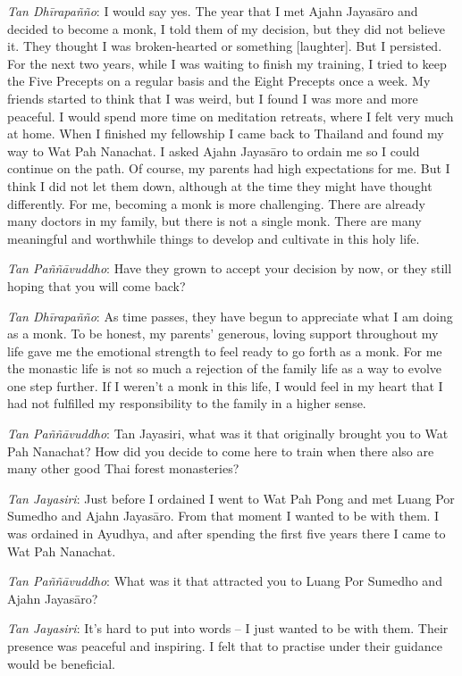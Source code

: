 \emph{Tan Dhīrapañño}: I would say yes. The year that I met Ajahn
Jayasāro and decided to become a monk, I told them of my decision, but
they did not believe it. They thought I was broken-hearted or something
[laughter]. But I persisted. For the next two years, while I was
waiting to finish my training, I tried to keep the Five Precepts on a
regular basis and the Eight Precepts once a week. My friends started to
think that I was weird, but I found I was more and more peaceful. I
would spend more time on meditation retreats, where I felt very much at
home. When I finished my fellowship I came back to Thailand and found my
way to Wat Pah Nanachat. I asked Ajahn Jayasāro to ordain me so I could
continue on the path. Of course, my parents had high expectations for
me. But I think I did not let them down, although at the time they might
have thought differently. For me, becoming a monk is more challenging. 
There are already many doctors in my family, but there is not a single
monk. There are many meaningful and worthwhile things to develop and
cultivate in this holy life. 

\emph{Tan Paññāvuddho}: Have they grown to accept your decision by now, 
or they still hoping that you will come back? 

\emph{Tan Dhīrapañño}: As time passes, they have begun to appreciate
what I am doing as a monk. To be honest, my parents' generous, loving
support throughout my life gave me the emotional strength to feel ready
to go forth as a monk. For me the monastic life is not so much a
rejection of the family life as a way to evolve one step further. If I
weren't a monk in this life, I would feel in my heart that I had not
fulfilled my responsibility to the family in a higher sense. 

\emph{Tan Paññāvuddho}: Tan Jayasiri, what was it that originally
brought you to Wat Pah Nanachat? How did you decide to come here to
train when there also are many other good Thai forest monasteries? 

\emph{Tan Jayasiri}: Just before I ordained I went to Wat Pah Pong and
met Luang Por Sumedho and Ajahn Jayasāro. From that moment I wanted to
be with them. I was ordained in Ayudhya, and after spending the first
five years there I came to Wat Pah Nanachat. 

\emph{Tan Paññāvuddho}: What was it that attracted you to Luang Por
Sumedho and Ajahn Jayasāro? 

\emph{Tan Jayasiri}: It's hard to put into words -- I just wanted to be
with them. Their presence was peaceful and inspiring. I felt that to
practise under their guidance would be beneficial. 

